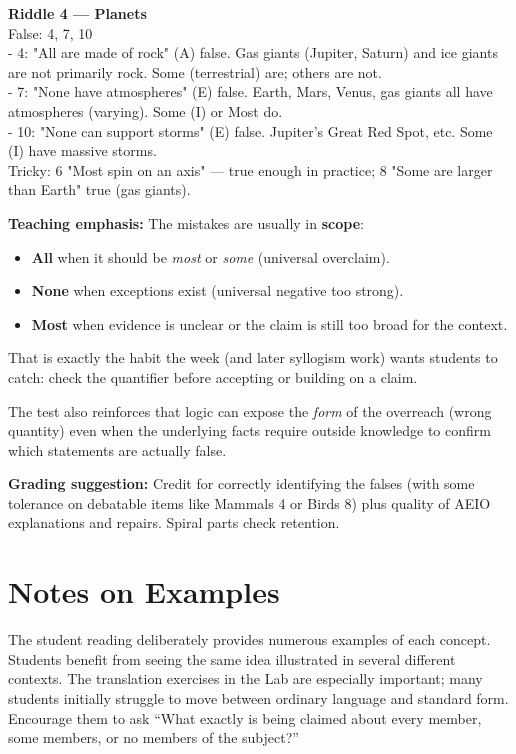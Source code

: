 \documentclass[12pt]{article}
\begin{document}
\textbf{Riddle 4 — Planets}\\
False: 4, 7, 10\\
- 4: "All are made of rock" (A) false. Gas giants (Jupiter, Saturn) and ice giants are not primarily rock. Some (terrestrial) are; others are not.\\
- 7: "None have atmospheres" (E) false. Earth, Mars, Venus, gas giants all have atmospheres (varying). Some (I) or Most do.\\
- 10: "None can support storms" (E) false. Jupiter's Great Red Spot, etc. Some (I) have massive storms.\\
Tricky: 6 "Most spin on an axis" — true enough in practice; 8 "Some are larger than Earth" true (gas giants).

\textbf{Teaching emphasis:} The mistakes are usually in \textbf{scope}:
\begin{itemize}
\item \textbf{All} when it should be \textit{most} or \textit{some} (universal overclaim).
\item \textbf{None} when exceptions exist (universal negative too strong).
\item \textbf{Most} when evidence is unclear or the claim is still too broad for the context.
\end{itemize}
That is exactly the habit the week (and later syllogism work) wants students to catch: check the quantifier before accepting or building on a claim.

The test also reinforces that logic can expose the \textit{form} of the overreach (wrong quantity) even when the underlying facts require outside knowledge to confirm which statements are actually false.

\textbf{Grading suggestion:} Credit for correctly identifying the falses (with some tolerance on debatable items like Mammals 4 or Birds 8) plus quality of AEIO explanations and repairs. Spiral parts check retention.

\section*{Notes on Examples}
The student reading deliberately provides numerous examples of each concept. Students benefit from seeing the same idea illustrated in several different contexts. The translation exercises in the Lab are especially important; many students initially struggle to move between ordinary language and standard form. Encourage them to ask “What exactly is being claimed about every member, some members, or no members of the subject?”
\end{document}
